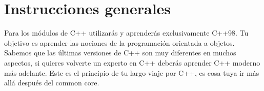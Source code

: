 

\chapter{Instrucciones generales}

Para los módulos de C++ utilizarás y aprenderás exclusivamente C++98.
Tu objetivo es aprender las nociones de la programación orientada a objetos.
Sabemos que las últimas versiones de C++ son muy diferentes en muchos aspectos,
si quieres volverte un experto en C++ deberás aprender C++ moderno más adelante.
Este es el principio de tu largo viaje por C++, es cosa tuya ir más allá
después del common core.


